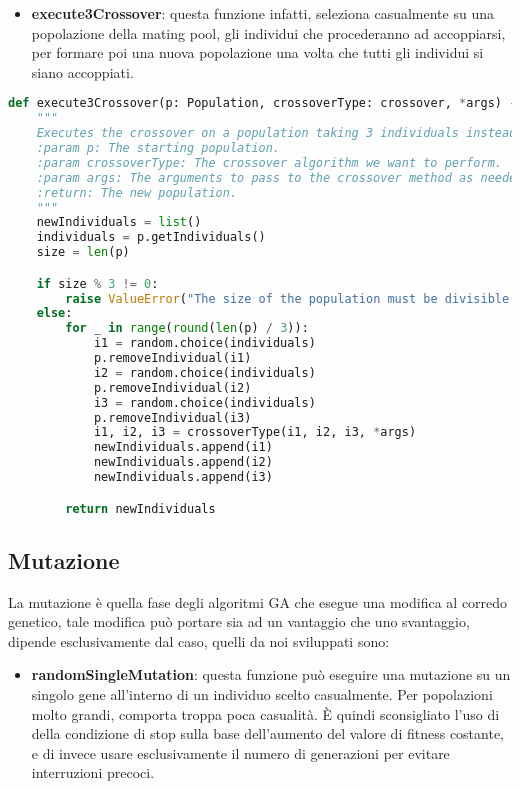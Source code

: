 \documentclass{article}
\begin{document}
\begin{itemize}
\item\textbf{execute3Crossover}: questa funzione infatti, seleziona casualmente su una popolazione della mating pool, gli individui che procederanno ad accoppiarsi, per formare poi una nuova popolazione una volta che tutti gli individui si siano accoppiati.
\end{itemize}

\begin{lstlisting}[language=Python]
def execute3Crossover(p: Population, crossoverType: crossover, *args) -> list[Individual]:
    """
    Executes the crossover on a population taking 3 individuals instead of 2.
    :param p: The starting population.
    :param crossoverType: The crossover algorithm we want to perform.
    :param args: The arguments to pass to the crossover method as needed.
    :return: The new population.
    """
    newIndividuals = list()
    individuals = p.getIndividuals()
    size = len(p)

    if size % 3 != 0:
        raise ValueError("The size of the population must be divisible by 3!")
    else:
        for _ in range(round(len(p) / 3)):
            i1 = random.choice(individuals)
            p.removeIndividual(i1)
            i2 = random.choice(individuals)
            p.removeIndividual(i2)
            i3 = random.choice(individuals)
            p.removeIndividual(i3)
            i1, i2, i3 = crossoverType(i1, i2, i3, *args)
            newIndividuals.append(i1)
            newIndividuals.append(i2)
            newIndividuals.append(i3)

        return newIndividuals
\end{lstlisting}



\pagebreak

\subsection{Mutazione}

La mutazione è quella fase degli algoritmi GA che esegue una modifica al corredo genetico, tale modifica può portare sia ad un vantaggio che uno svantaggio, dipende esclusivamente dal caso, quelli da noi sviluppati sono:

\begin{itemize}
\item\textbf{randomSingleMutation}: questa funzione può eseguire una mutazione su un singolo gene all'interno di un individuo scelto casualmente.
Per popolazioni molto grandi, comporta troppa poca casualità. È quindi sconsigliato l'uso di della condizione di stop sulla base dell'aumento del valore di fitness costante, e di invece usare esclusivamente il numero di generazioni per evitare interruzioni precoci.
\end{itemize}
\end{document}
